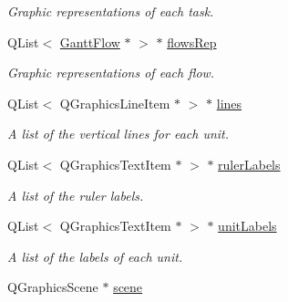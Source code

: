 \begin{DoxyCompactItemize}
\begin{DoxyCompactList}\small\item\em Graphic representations of each task. \end{DoxyCompactList}\item 
\hypertarget{class_main_window_ab3c8fa1d1db3eb29de99197692da7028}{}Q\+List$<$ \hyperlink{class_gantt_flow}{Gantt\+Flow} $\ast$ $>$ $\ast$ \hyperlink{class_main_window_ab3c8fa1d1db3eb29de99197692da7028}{flows\+Rep}\label{class_main_window_ab3c8fa1d1db3eb29de99197692da7028}

\begin{DoxyCompactList}\small\item\em Graphic representations of each flow. \end{DoxyCompactList}\item 
\hypertarget{class_main_window_a60463caf2bb888172a6dcbae02004739}{}Q\+List$<$ Q\+Graphics\+Line\+Item $\ast$ $>$ $\ast$ \hyperlink{class_main_window_a60463caf2bb888172a6dcbae02004739}{lines}\label{class_main_window_a60463caf2bb888172a6dcbae02004739}

\begin{DoxyCompactList}\small\item\em A list of the vertical lines for each unit. \end{DoxyCompactList}\item 
\hypertarget{class_main_window_aea62adad51ab139eb7eaa498a23a7b9a}{}Q\+List$<$ Q\+Graphics\+Text\+Item $\ast$ $>$ $\ast$ \hyperlink{class_main_window_aea62adad51ab139eb7eaa498a23a7b9a}{ruler\+Labels}\label{class_main_window_aea62adad51ab139eb7eaa498a23a7b9a}

\begin{DoxyCompactList}\small\item\em A list of the ruler labels. \end{DoxyCompactList}\item 
\hypertarget{class_main_window_a33c063caa7e87dc13a3d943aabc77a49}{}Q\+List$<$ Q\+Graphics\+Text\+Item $\ast$ $>$ $\ast$ \hyperlink{class_main_window_a33c063caa7e87dc13a3d943aabc77a49}{unit\+Labels}\label{class_main_window_a33c063caa7e87dc13a3d943aabc77a49}

\begin{DoxyCompactList}\small\item\em A list of the labels of each unit. \end{DoxyCompactList}\item 
\hypertarget{class_main_window_a51ac2b126495216832501cea3929c6f6}{}Q\+Graphics\+Scene $\ast$ \hyperlink{class_main_window_a51ac2b126495216832501cea3929c6f6}{scene}\label{class_main_window_a51ac2b126495216832501cea3929c6f6}


\end{DoxyCompactItemize}
